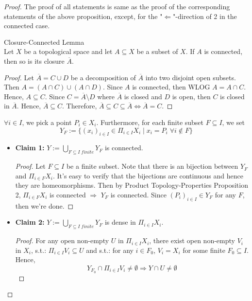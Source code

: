 \begin{proof}
    The proof of all statements is same as the proof of the corresponding statements of the above proposition, except, for the "$\Leftarrow$"-direction of 2 in the connected case.
    \begin{lemma}{Closure-Connected Lemma}\\
    Let $X$ be a topological space and let $A \subseteq X$ be a subset of $X$. If $A$ is connected, then so is its closure $\overline{A}$.
    \end{lemma}
    
    \begin{proof}
        Let $\overline{A} = C \cup D$ be a decomposition of $\overline{A}$ into two disjoint open subsets. Then $A= (A \cap C) \cup (A \cap D)$. Since $A$ is connected, then WLOG $A=A\cap C$. Hence, $A \subseteq C$. Since $C= \overline{A} \setminus D$ where $\overline{A}$ is closed and $D$ is open, then $C$ is closed in $\overline{A}$. Hence, $\overline{A} \subseteq C$. Therefore, $\overline{A} \subseteq C \subseteq \overline{A} \Leftrightarrow \overline{A} = C$.
    \end{proof}

    $\forall i \in I$, we pick a point $P_i \in X_i$. Furthermore, for each finite subset $F \subseteq I$, we set
    $$Y_F:=\{ (x_i)_{i \in I} \in \Pi_{i \in I} X_i \mid x_i=P_i\;\forall i \notin F\}$$

    \begin{itemize}
        \item \textbf{Claim 1:} $Y:= \bigcup_{F \subseteq I\;finite} Y_F$ is connected.
        \begin{proof}
            Let $F \subseteq I$ be a finite subset. Note that there is an bijection between $Y_F$ and $\Pi_{i\in F}X_i$. It's easy to verify that the bijections are continuous and hence they are homeomorphisms. Then by Product Topology-Properties Proposition 2, $\Pi_{i \in F} X_i$ is connected $\Rightarrow$ $Y_F$ is connected. Since $(P_i)_{i \in I} \in Y_F$ for any $F$, then we're done.
        \end{proof}

        \item \textbf{Claim 2:} $Y:= \bigcup_{F \subseteq I\;finite} Y_F$ is dense in $\Pi_{i \in I} X_i$.
        \begin{proof}
            For any open non-empty $U$ in $\Pi_{i \in I}X_i$, there exist open non-empty $V_i$ in $X_i$, s.t.:
            $\Pi_{i \in I} V_i \subseteq U$
            and s.t.: for any $i \in F_0$, $V_i =X_i$ for some finite $F_0 \subseteq I$. Hence,
            $$Y_{F_0} \cap \Pi_{i \in I} V_i \neq \emptyset \Rightarrow Y \cap U \neq \emptyset$$
        \end{proof}
    \end{itemize}
\end{proof}

